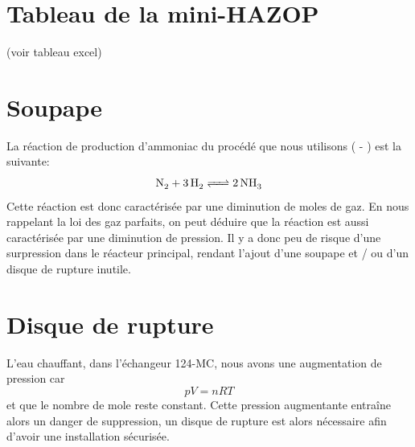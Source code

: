 \documentclass[a4paper,12pt, oneside]{article}
\begin{document}
\section{Tableau de la mini-HAZOP}

(voir tableau excel)

\section{Soupape}
La réaction de production d'ammoniac du procédé que nous utilisons ( - ) est la suivante:
$$\ce{N2 +3H2 <=> 2NH3}$$
Cette réaction est donc caractérisée par une diminution de moles de gaz. En nous rappelant la loi des gaz parfaits, on peut déduire que la réaction est aussi caractérisée par une diminution de pression. Il y a donc peu de risque d'une surpression dans le réacteur principal, rendant l'ajout d'une soupape et / ou d'un disque de rupture inutile.

\section{Disque de rupture}
L'eau chauffant, dans l'échangeur 124-MC, nous avons une augmentation de pression car $$pV=nRT$$ et que le nombre de mole reste constant. Cette pression augmentante entraîne alors un danger de suppression, un disque de rupture est alors nécessaire afin d'avoir une installation sécurisée.
\end{document}
